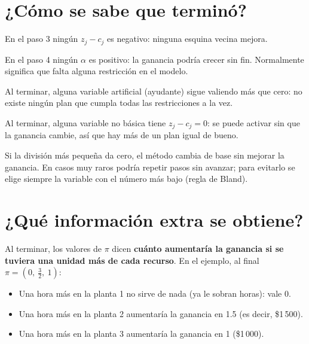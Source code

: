 \documentclass[11pt,a4paper]{article}
\begin{document}
\section{¿Cómo se sabe que terminó?}

\begin{description}[leftmargin=0pt, itemsep=5pt]
  \item[Solución óptima.] En el paso 3 ningún $z_j - c_j$ es negativo: ninguna esquina vecina mejora.
  \item[Problema no acotado.] En el paso 4 ningún $\alpha$ es positivo: la ganancia podría crecer sin fin.
        Normalmente significa que falta alguna restricción en el modelo.
  \item[Problema sin solución.] Al terminar, alguna variable artificial (ayudante) sigue valiendo más que cero:
        no existe ningún plan que cumpla todas las restricciones a la vez.
  \item[Varias soluciones óptimas.] Al terminar, alguna variable no básica tiene $z_j - c_j = 0$: se puede
        activar sin que la ganancia cambie, así que hay más de un plan igual de bueno.
  \item[Empates.] Si la división más pequeña da cero, el método cambia de base sin mejorar la ganancia. En casos
        muy raros podría repetir pasos sin avanzar; para evitarlo se elige siempre la variable con el número más
        bajo (regla de Bland).
\end{description}

\section{¿Qué información extra se obtiene?}

Al terminar, los valores de $\pi$ dicen \textbf{cuánto aumentaría la ganancia si se tuviera una unidad más de
cada recurso}. En el ejemplo, al final $\pi = (0,\ \tfrac32,\ 1)$:

\begin{itemize}[itemsep=2pt]
  \item Una hora más en la planta 1 no sirve de nada (ya le sobran horas): vale 0.
  \item Una hora más en la planta 2 aumentaría la ganancia en 1.5 (es decir, \$1\,500).
  \item Una hora más en la planta 3 aumentaría la ganancia en 1 (\$1\,000).
\end{itemize}
\end{document}
